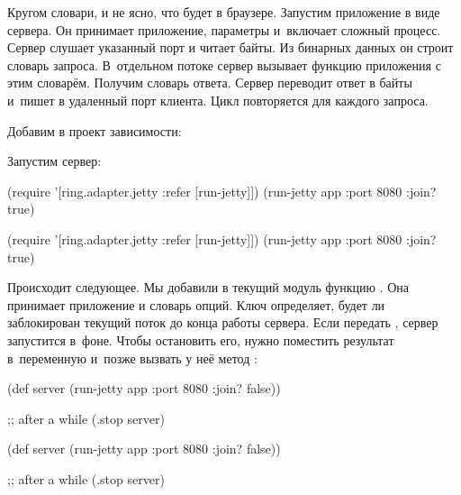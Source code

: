 \fi

Кругом словари, и не ясно, что будет в браузере. Запустим приложение в виде
сервера. Он принимает приложение, параметры и~включает сложный процесс. Сервер
слушает указанный порт и читает байты. Из бинарных данных он строит словарь
запроса. В~отдельном потоке сервер вызывает функцию приложения с этим
словарём. Получим словарь ответа. Сервер переводит ответ в байты и~пишет в
удаленный порт клиента. Цикл повторяется для каждого запроса.


Добавим в проект зависимости:

\begin{clojure}
\end{clojure}

Запустим сервер:

\ifnarrow

\begin{clojure}
(require '[ring.adapter.jetty
           :refer [run-jetty]])
(run-jetty app {:port 8080 :join? true})
\end{clojure}

\else

\begin{clojure}
(require '[ring.adapter.jetty :refer [run-jetty]])
(run-jetty app {:port 8080 :join? true})
\end{clojure}

\fi

Происходит следующее. Мы добавили в текущий модуль функцию . Она
принимает приложение и словарь опций. Ключ  определяет, будет ли
заблокирован текущий поток до конца работы сервера. Если передать ,
сервер запустится в~фоне. Чтобы остановить его, нужно поместить результат
 в~переменную и~позже вызвать у неё метод :

\ifnarrow

\begin{clojure}
(def server
  (run-jetty app {:port 8080
                  :join? false}))

;; after a while
(.stop server)
\end{clojure}

\else

\begin{clojure}
(def server
  (run-jetty app {:port 8080 :join? false}))

;; after a while
(.stop server)
\end{clojure}


